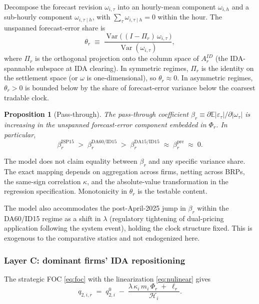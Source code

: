 \documentclass[11pt]{article}
\newtheorem{proposition}{Proposition}
\begin{document}
Decompose the forecast revision $\omega_{i,\tau}$ into an hourly-mean component $\omega_{i,h}$ and a sub-hourly component $\omega_{i,\tau\mid h}$, with $\sum_{\tau} \omega_{i,\tau\mid h} = 0$ within the hour. The unspanned forecast-error share is
\begin{equation}
\theta_{r} \;\equiv\; \frac{\operatorname{Var}\!\big(\,(I - \Pi_{r})\,\omega_{i,\tau}\,\big)}{\operatorname{Var}(\omega_{i,\tau})},
\end{equation}
where $\Pi_{r}$ is the orthogonal projection onto the column space of $A^{ID}_r$ (the IDA-spannable subspace at IDA clearing). In symmetric regimes, $\Pi_{r}$ is the identity on the settlement space (or $\omega$ is one-dimensional), so $\theta_{r} \approx 0$. In asymmetric regimes, $\theta_{r} > 0$ is bounded below by the share of forecast-error variance below the coarsest tradable clock.

\begin{proposition}[Pass-through]
\label{prop:passthrough}
The pass-through coefficient $\beta_{r} \equiv \partial \mathbb{E}|\varepsilon_{\tau}|/\partial |\omega_{\tau}|$ is increasing in the unspanned forecast-error component embedded in $\Phi_{r}$. In particular,
\[
\beta_{r}^{\text{ISP15}} \;>\; \beta_{r}^{\text{DA60/ID15}} \;>\; \beta_{r}^{\text{DA15/ID15}} \;\approx\; \beta_{r}^{\text{pre}} \;\approx\; 0.
\]
\end{proposition}

The model does not claim equality between $\beta_{r}$ and any specific variance share. The exact mapping depends on aggregation across firms, netting across BRPs, the same-sign correlation $\kappa$, and the absolute-value transformation in the regression specification. Monotonicity in $\theta_{r}$ is the testable content.

The model also accommodates the post-April-2025 jump in $\beta_{r}$ within the DA60/ID15 regime as a shift in $\lambda$ (regulatory tightening of dual-pricing application following the system event), holding the clock structure fixed. This is exogenous to the comparative statics and not endogenized here.

\subsubsection*{Layer C: dominant firms' IDA repositioning}

The strategic FOC \eqref{eq:foc} with the linearization \eqref{eq:nulinear} gives
\begin{equation}
\boxed{\;\;
q_{2,i,r} \;=\; q^{0}_{2,i} \;-\; \frac{\lambda\,\kappa_{i}\,m_{i}\,\Phi_{r} \;+\; \ell_{r}}{\mathcal{H}_{i}}.
\;\;}
\label{eq:layerC}
\end{equation}
\end{document}
